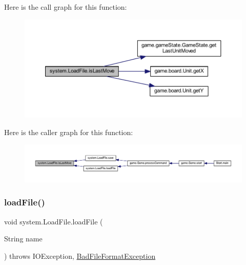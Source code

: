 Here is the call graph for this function\+:
\nopagebreak
\begin{figure}[H]
\begin{center}
\leavevmode
\includegraphics[width=350pt]{classsystem_1_1_load_file_a5d3c0a0b1a0c4fda2ebb8f992db8eeae_cgraph}
\end{center}
\end{figure}
Here is the caller graph for this function\+:
\nopagebreak
\begin{figure}[H]
\begin{center}
\leavevmode
\includegraphics[width=350pt]{classsystem_1_1_load_file_a5d3c0a0b1a0c4fda2ebb8f992db8eeae_icgraph}
\end{center}
\end{figure}
\mbox{\label{classsystem_1_1_load_file_adf1c31e03c1dd422118d122ef17dc96e}} 
\subsubsection{\texorpdfstring{load\+File()}{loadFile()}}
{\footnotesize\ttfamily void system.\+Load\+File.\+load\+File (\begin{DoxyParamCaption}\item[{String}]{name }\end{DoxyParamCaption}) throws I\+O\+Exception, \mbox{\hyperlink{classsystem_1_1_bad_file_format_exception}{Bad\+File\+Format\+Exception}}\hspace{0.3cm}{\ttfamily [inline]}}

